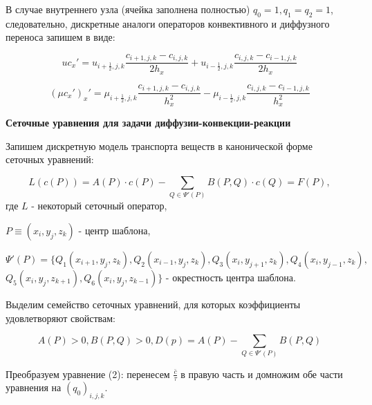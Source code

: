\documentclass[12pt]{article}
\begin{document}
 В случае внутреннего узла (ячейка заполнена полностью) $q_0=1, q_1=q_2=1$, следовательно, дискретные аналоги  операторов конвективного и диффузного переноса запишем в виде:
 
\begin{equation*}
	uc_x'=u_{i+\frac{1}{2},j,k}\frac{c_{i+1,j,k}-c_{i,j,k}}{2h_x} + u_{i-\frac{1}{2},j,k}\frac{c_{i,j,k}-c_{i-1,j,k}}{2h_x}  
\end{equation*}
 
\begin{equation*}
    (\mu c_x')_x'=\mu_{i+\frac{1}{2},j,k}\frac{c_{i+1,j,k}-c_{i,j,k}}{h_x^2} - \mu_{i-\frac{1}{2},j,k}\frac{c_{i,j,k}-c_{i-1,j,k}}{h_x^2}
\end{equation*}

 \center \textbf  {Сеточные уравнения для задачи диффузии-конвекции-реакции}

Запишем дискретную модель транспорта веществ в канонической форме сеточных уравнений:


\begin{equation}
	L(c(P)) = A(P)\cdot c(P)-\sum_{Q\in \Psi'(P)}B(P,Q)\cdot c(Q) = F(P),
\end{equation}
где $L$ - некоторый сеточный оператор,

$P\equiv(x_i,y_j,z_k)$ - центр шаблона,

$\Psi'(P)=\{Q_1(x_{i+1},y_j,z_k), Q_2(x_{i-1},y_j,z_k), Q_3(x_i,y_{j+1},z_k), Q_4(x_i,y_{j-1},z_k),$ $ Q_5(x_i,y_j,z_{k+1}), Q_6(x_i,y_j,z_{k-1})\} $  - окрестность центра шаблона.

Выделим семейство сеточных уравнений, для которых коэффициенты удовлетворяют свойствам:

\begin{equation}
A(P)>0, B(P,Q)>0, D(p)=A(P) - \sum_{Q\in \Psi'(P)}B(P,Q)   
\end{equation}

\begin{flushleft} Преобразуем уравнение (2):
перенесем $ \frac{\bar{c}}{\tau} $ в правую часть и домножим обе части уравнения на $(q_0)_{i,j,k}$.
\end{flushleft}
\end{document}
